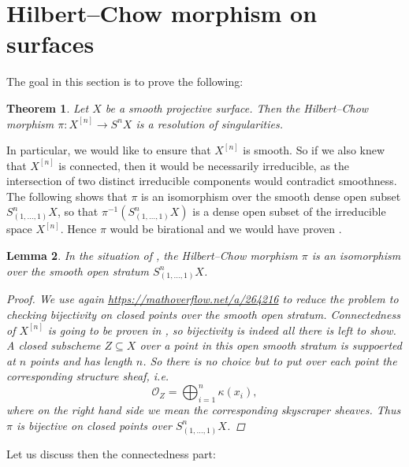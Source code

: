 \documentclass[12pt,a4paper]{amsart}
\theoremstyle{plain}
\newtheorem{thm}{Theorem}[section]
\newtheorem{lm}[thm]{Lemma}
\theoremstyle{definition}
\theoremstyle{remark}
\begin{document}
\section{Hilbert--Chow morphism on surfaces}

The goal in this section is to prove the following:

\begin{thm}\label{thm:resolution}
  Let $X$ be a smooth projective surface.
  Then the Hilbert--Chow morphism $\pi \colon X^{[n]} \to S^{n}X$ is a resolution of singularities.
\end{thm}

In particular, we would like to ensure that $X^{[n]}$ is smooth.
So if we also knew that $X^{[n]}$ is connected, then it would be necessarily irreducible, as the intersection of two distinct irreducible components would contradict smoothness.
The following  shows that $\pi$ is an isomorphism over the smooth dense open subset $S^{n}_{(1,\ldots,1)}X$, so that $\pi^{-1}(S^{n}_{(1, \ldots, 1)}X)$ is a dense open subset of the irreducible space $X^{[n]}$.
Hence $\pi$ would be birational and we would have proven .

\begin{lm}\label{lm:overstratum}
  In the situation of , the Hilbert--Chow morphism $\pi$ is an isomorphism over the smooth open stratum $S^{n}_{(1,\ldots,1)}X$.
  \begin{proof}
    We use again \url{https://mathoverflow.net/a/264216} to reduce the problem to checking bijectivity on closed points over the smooth open stratum.
    Connectedness of $X^{[n]}$ is going to be proven in , so bijectivity is indeed all there is left to show.
    A closed subscheme $Z \subseteq X$ over a point in this open smooth stratum is suppoerted at $n$ points and has length $n$.
    So there is no choice but to put over each point the corresponding structure sheaf, i.e.
    \[ \mathscr{O}_{Z} = \bigoplus_{i = 1}^{n} \kappa(x_{i}), \]
    where on the right hand side we mean the corresponding skyscraper sheaves.
    Thus $\pi$ is bijective on closed points over $S^{n}_{(1, \ldots, 1)}X$.
  \end{proof}
\end{lm}

Let us discuss then the connectedness part:
\end{document}
